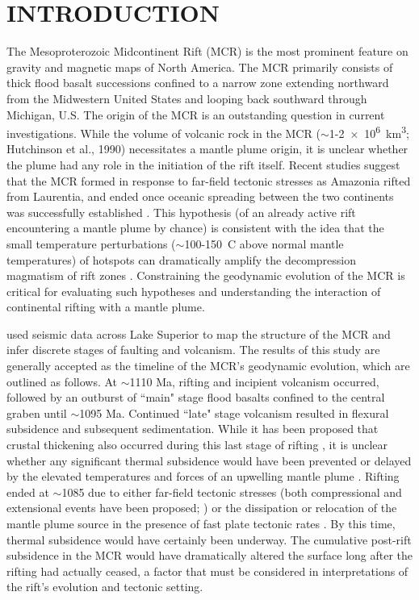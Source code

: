 \documentclass[12pt,letterpaper]{article}
\begin{document}
\section*{INTRODUCTION}
The Mesoproterozoic Midcontinent Rift (MCR) is the most prominent feature on gravity and magnetic maps of North America. The MCR primarily consists of thick flood basalt successions confined to a narrow zone extending northward from the Midwestern United States and looping back southward through Michigan, U.S. The origin of the MCR is an outstanding question in current investigations. While the volume of volcanic rock in the MCR ($\sim$1-\SI{2e6}{km^3}; Hutchinson et al., 1990\nocite{Hutchinson1990a}) necessitates a mantle plume origin, it is unclear whether the plume had any role in the initiation of the rift itself. Recent studies suggest that the MCR formed in response to far-field tectonic stresses as Amazonia rifted from Laurentia, and ended once oceanic spreading between the two continents was successfully established \cite{Stein2014a}. This hypothesis (of an already active rift encountering a mantle plume by chance) is consistent with the idea that the small temperature perturbations ($\sim$100-150\textdegree\ C above normal mantle temperatures) of hotspots can dramatically amplify the decompression magmatism of rift zones \citep{White1989a}. Constraining the geodynamic evolution of the MCR is critical for evaluating such hypotheses and understanding the interaction of continental rifting with a mantle plume.\par

\cite{Cannon1992a} used seismic data across Lake Superior to map the structure of the MCR and infer discrete stages of faulting and volcanism. The results of this study are generally accepted as the timeline of the MCR's geodynamic evolution, which are outlined as follows. At $\sim$1110 Ma, rifting and incipient volcanism occurred, followed by an outburst of ``main" stage flood basalts confined to the central graben until $\sim$1095 Ma. Continued ``late" stage volcanism resulted in flexural subsidence and subsequent sedimentation. While it has been proposed that crustal thickening also occurred during this last stage of rifting \citep{Stein2015a}, it is unclear whether any significant thermal subsidence would have been prevented or delayed by the elevated temperatures and forces of an upwelling mantle plume \citep{White1997a}. Rifting ended at $\sim$1085 due to either far-field tectonic stresses (both compressional and extensional events have been proposed; \cite{Stein2014a,Cannon1994a}) or the dissipation or relocation of the mantle plume source in the presence of fast plate tectonic rates \citep{Swanson-Hysell2014a}. By this time, thermal subsidence would have certainly been underway. The cumulative post-rift subsidence in the MCR would have dramatically altered the surface long after the rifting had actually ceased, a factor that must be considered in interpretations of the rift's evolution and tectonic setting.\par
\end{document}
